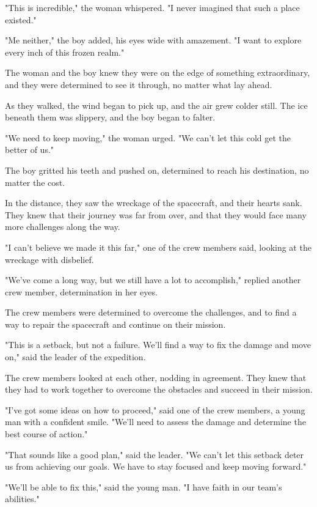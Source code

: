 \documentclass[smalldemyvopaper,11pt,twoside,onecolumn,openright,extrafontsizes]{memoir}
\begin{document}
"This is incredible," the woman whispered. "I never imagined that such a place existed."\par
"Me neither," the boy added, his eyes wide with amazement. "I want to explore every inch of this frozen realm."\par
The woman and the boy knew they were on the edge of something extraordinary, and they were determined to see it through, no matter what lay ahead.\par
As they walked, the wind began to pick up, and the air grew colder still. The ice beneath them was slippery, and the boy began to falter.\par
"We need to keep moving," the woman urged. "We can't let this cold get the better of us."\par
The boy gritted his teeth and pushed on, determined to reach his destination, no matter the cost.\par
In the distance, they saw the wreckage of the spacecraft, and their hearts sank. They knew that their journey was far from over, and that they would face many more challenges along the way.\par
"I can't believe we made it this far," one of the crew members said, looking at the wreckage with disbelief.\par
"We've come a long way, but we still have a lot to accomplish," replied another crew member, determination in her eyes.\par
The crew members were determined to overcome the challenges, and to find a way to repair the spacecraft and continue on their mission.\par
"This is a setback, but not a failure. We'll find a way to fix the damage and move on," said the leader of the expedition.\par
The crew members looked at each other, nodding in agreement. They knew that they had to work together to overcome the obstacles and succeed in their mission.\par
"I've got some ideas on how to proceed," said one of the crew members, a young man with a confident smile. "We'll need to assess the damage and determine the best course of action."\par
"That sounds like a good plan," said the leader. "We can't let this setback deter us from achieving our goals. We have to stay focused and keep moving forward."\par
"We'll be able to fix this," said the young man. "I have faith in our team's abilities."\par
\end{document}
